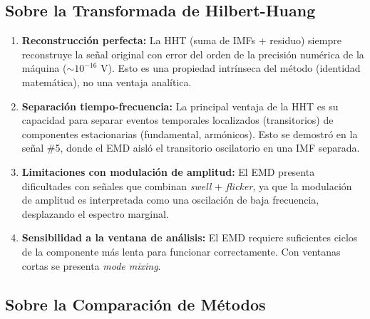 \documentclass[12pt,a4paper]{article}
\begin{document}
\subsection{Sobre la Transformada de Hilbert-Huang}

\begin{enumerate}
    \item \textbf{Reconstrucción perfecta:} La HHT (suma de IMFs + residuo) siempre reconstruye la señal original con error del orden de la precisión numérica de la máquina ($\sim10^{-16}$ V). Esto es una propiedad intrínseca del método (identidad matemática), no una ventaja analítica.

    \item \textbf{Separación tiempo-frecuencia:} La principal ventaja de la HHT es su capacidad para separar eventos temporales localizados (transitorios) de componentes estacionarias (fundamental, armónicos). Esto se demostró en la señal \#5, donde el EMD aisló el transitorio oscilatorio en una IMF separada.


    \item \textbf{Limitaciones con modulación de amplitud:} El EMD presenta dificultades con señales que combinan \textit{swell} + \textit{flicker}, ya que la modulación de amplitud es interpretada como una oscilación de baja frecuencia, desplazando el espectro marginal.

    \item \textbf{Sensibilidad a la ventana de análisis:} El EMD requiere suficientes ciclos de la componente más lenta para funcionar correctamente. Con ventanas cortas se presenta \textit{mode mixing}.
\end{enumerate}

\subsection{Sobre la Comparación de Métodos}
\end{document}
